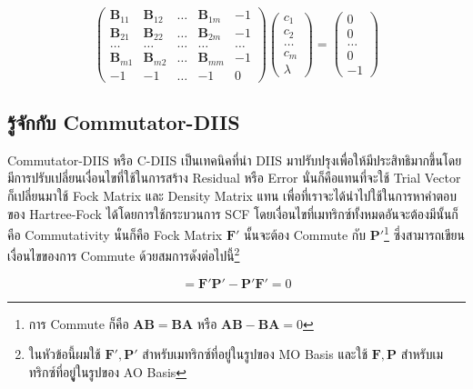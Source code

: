 \begin{equation}
  \begin{pmatrix} 
    \mathbf{B}_{11} & \mathbf{B}_{12} & \dots & \mathbf{B}_{1m} & -1 \\ 
    \mathbf{B}_{21} & \mathbf{B}_{22} & \dots & \mathbf{B}_{2m} & -1 \\ 
    \dots & \dots & \dots & \dots & \dots \\ 
    \mathbf{B}_{m1} & \mathbf{B}_{m2} & \dots & \mathbf{B}_{mm} & -1 \\ 
    -1 & -1 & \dots & -1 & 0 
  \end{pmatrix}
  \begin{pmatrix} 
    c_1 \\ c_2 \\ \dots \\ c_m \\ \lambda 
  \end{pmatrix} 
  =
  \begin{pmatrix} 
    0 \\ 0 \\ \dots \\ 0 \\ -1 
  \end{pmatrix}
\end{equation}

\subsection{รู้จักกับ Commutator-DIIS}

Commutator-DIIS หรือ C-DIIS เป็นเทคนิคที่นำ DIIS มาปรับปรุงเพื่อให้มีประสิทธิมากขึ้นโดยมีการปรับเปลี่ยนเงื่อนไขที่ใช้ในการสร้าง 
Residual หรือ Error\autocite{pulay1982} นั่นก็คือแทนที่จะใช้ Trial Vector ก็เปลี่ยนมาใช้ Fock Matrix และ Density Matrix แทน 
เพื่อที่เราจะได้นำไปใช้ในการหาคำตอบของ Hartree-Fock ได้โดยการใช้กระบวนการ SCF โดยเงื่อนไขที่เมทริกซ์ทั้งหมดอันจะต้องมีนั้นก็คือ 
Commutativity นั่นก็คือ Fock Matrix $\mathbf{F'}$ นั้นจะต้อง Commute กับ $\mathbf{P'}$\footnote{การ Commute 
ก็คือ $\mathbf{A B} = \mathbf{B A}$ หรือ $\mathbf{A B} - \mathbf{B A} = 0$} ซึ่งสามารถเขียนเงื่อนไขของการ Commute 
ด้วยสมการดังต่อไปนี้\footnote{ในหัวข้อนี้ผมใช้ $\mathbf{F'}, \mathbf{P'}$ สำหรับเมทริกซ์ที่อยู่ในรูปของ MO Basis และใช้ 
$\mathbf{F}, \mathbf{P}$ สำหรับเมทริกซ์ที่อยูู่ในรูปของ AO Basis}

\begin{equation}
  [\mathbf{F'},\mathbf{P'}] 
  = 
  \mathbf{F'}\mathbf{P'} - \mathbf{P'}\mathbf{F'} 
  = 
  0
\end{equation}


